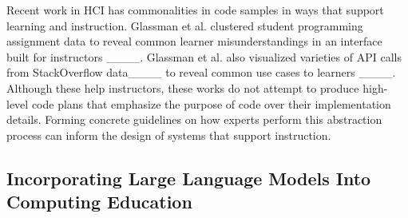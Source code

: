 

Recent work in HCI has  commonalities in code samples in ways that support learning and instruction. Glassman et al. clustered student programming assignment data to reveal common learner misunderstandings in an interface built for instructors ____. 
Glassman et al. also visualized varieties of API calls from StackOverflow data____ to reveal common use cases to learners ____.  
Although these  help instructors, these works do not attempt to produce high-level code plans that emphasize the purpose of code over their implementation details. 
Forming concrete guidelines on how experts perform this abstraction process can inform the design of systems that support instruction.


\subsection{Incorporating Large Language Models Into Computing Education}

